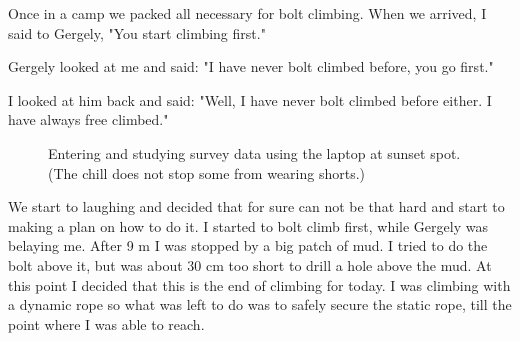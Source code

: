 Once in a camp we packed all necessary for bolt climbing. When we
arrived, I said to Gergely, "You start climbing first."

Gergely looked
at me and said: "I have never bolt climbed before, you go first."

I looked at him back and said: "Well, I have never bolt climbed before
either. I have always free climbed."

\begin{figure}[t!]
\checkoddpage \ifoddpage \forcerectofloat \else \forceversofloat \fi
\centering
 \caption{Entering and studying survey data using the laptop at sunset spot. (The chill does not stop some from wearing shorts.) }
 \label{dan jarv data}
\end{figure}

We start to laughing and decided that for sure can not be that hard and start to making a plan on how to do it. I started to bolt climb first, while Gergely was belaying me. After 9 m I was stopped by a big patch of mud. I tried to do the bolt above it, but was about 30 cm too short to drill a hole above the mud. At this point I decided that this is the end of climbing for today. I was climbing with a dynamic rope so what was left to do was to safely secure the static rope, till the point where I was able to reach.

